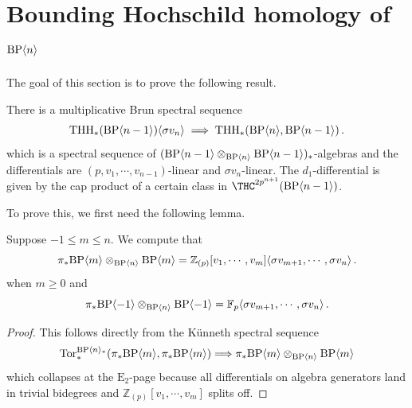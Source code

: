\section{Bounding Hochschild homology of \texorpdfstring{$\mathrm{BP}\langle n\rangle$}{BP n }}\label{sec:bounding}
The goal of this section is to prove the following result.  
\begin{proposition}\label{prop:brunss}
There is a multiplicative Brun spectral sequence 
\begin{equation}\label{BrunSS}
\operatorname{THH}_*(\mathrm{BP}\langle n-1 \rangle)\langle \sigma v_{n}\rangle \implies \operatorname{THH}_*(\mathrm{BP}\langle n\rangle,\mathrm{BP}\langle n-1\rangle)\,.
\end{equation}
which is a spectral sequence of $(\mathrm{BP}\langle n-1 \rangle\otimes_{\mathrm{BP}\langle n\rangle}\mathrm{BP}\langle n-1 \rangle)_*$-algebras and the differentials are $(p,v_1,\cdots ,v_{n-1})$-linear and $\sigma v_{n}$-linear. The $d_1$-differential is given by the cap product of a certain class in $\THC^{2p^{n+1}}(\BP\langle n-1\rangle)$.  
\end{proposition}

To prove this, we first need the following lemma. 
\begin{lemma}\label{lem:BPn-rel-cooperations}
Suppose $-1\le m\le n$. We compute that 
\[\pi_*\mathrm{BP}\langle m \rangle\otimes_{\mathrm{BP}\langle n\rangle}\mathrm{BP}\langle m \rangle=\mathbb{Z}_{(p)}[v_1,\cdots ,v_{m}]\langle \sigma v_{m+1} , \cdots ,\sigma v_{n} \rangle \,. \]
when $m \geq 0$ and 
\[
\pi_*\mathrm{BP}\langle -1 \rangle\otimes_{\mathrm{BP}\langle n\rangle}\mathrm{BP}\langle -1\rangle=\mathbb{F}_p\langle \sigma v_{m+1} , \cdots ,\sigma v_{n} \rangle \,. 
\]
\end{lemma}
\begin{proof}
This follows directly from the K\"unneth spectral sequence
\[ 
\operatorname{Tor}_*^{\mathrm{BP}\langle n\rangle_*}(\pi_*\mathrm{BP}\langle m\rangle,\pi_*\mathrm{BP}\langle m\rangle)\Longrightarrow \pi_*\mathrm{BP}\langle m\rangle\otimes_{\mathrm{BP}\langle n\rangle}\mathrm{BP}\langle m\rangle
\]
which collapses at the $\mathrm{E}_2$-page because all differentials on algebra generators land in trivial bidegrees and $\mathbb{Z}_{(p)}[v_1,\cdots ,v_{m}]$ splits off. 
\end{proof}

